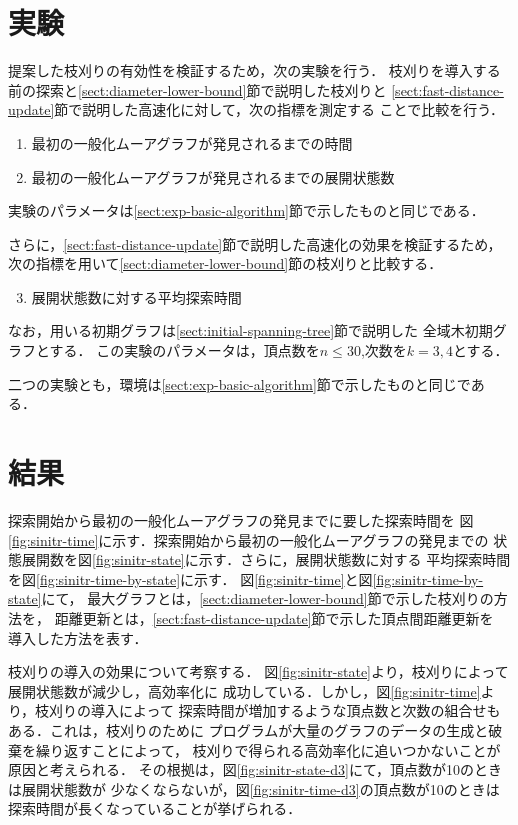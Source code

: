 \section{実験}
\label{sect:exp-reduce-by-prune}
提案した枝刈りの有効性を検証するため，次の実験を行う．
枝刈りを導入する前の探索と\ref{sect:diameter-lower-bound}節で説明した枝刈りと
\ref{sect:fast-distance-update}節で説明した高速化に対して，次の指標を測定する
ことで比較を行う．
\begin{enumerate}
\item 最初の一般化ムーアグラフが発見されるまでの時間
\item 最初の一般化ムーアグラフが発見されるまでの展開状態数
\end{enumerate}
実験のパラメータは\ref{sect:exp-basic-algorithm}節で示したものと同じである．

さらに，\ref{sect:fast-distance-update}節で説明した高速化の効果を検証するため，
次の指標を用いて\ref{sect:diameter-lower-bound}節の枝刈りと比較する．
\begin{enumerate}\setcounter{enumi}{2}
\item 展開状態数に対する平均探索時間
\end{enumerate}
なお，用いる初期グラフは\ref{sect:initial-spanning-tree}節で説明した
全域木初期グラフとする．
この実験のパラメータは，頂点数を$n\leq30$,次数を$k=3,4$とする．

二つの実験とも，環境は\ref{sect:exp-basic-algorithm}節で示したものと同じである．

\section{結果}
探索開始から最初の一般化ムーアグラフの発見までに要した探索時間を
図\ref{fig:sinitr-time}に示す．探索開始から最初の一般化ムーアグラフの発見までの
状態展開数を図\ref{fig:sinitr-state}に示す．さらに，展開状態数に対する
平均探索時間を図\ref{fig:sinitr-time-by-state}に示す．
図\ref{fig:sinitr-time}と図\ref{fig:sinitr-time-by-state}にて，
最大グラフとは，\ref{sect:diameter-lower-bound}節で示した枝刈りの方法を，
距離更新とは，\ref{sect:fast-distance-update}節で示した頂点間距離更新を
導入した方法を表す．

枝刈りの導入の効果について考察する．
図\ref{fig:sinitr-state}より，枝刈りによって展開状態数が減少し，高効率化に
成功している．しかし，図\ref{fig:sinitr-time}より，枝刈りの導入によって
探索時間が増加するような頂点数と次数の組合せもある．これは，枝刈りのために
プログラムが大量のグラフのデータの生成と破棄を繰り返すことによって，
枝刈りで得られる高効率化に追いつかないことが原因と考えられる．
その根拠は，図\ref{fig:sinitr-state-d3}にて，頂点数が10のときは展開状態数が
少なくならないが，図\ref{fig:sinitr-time-d3}の頂点数が10のときは
探索時間が長くなっていることが挙げられる．

